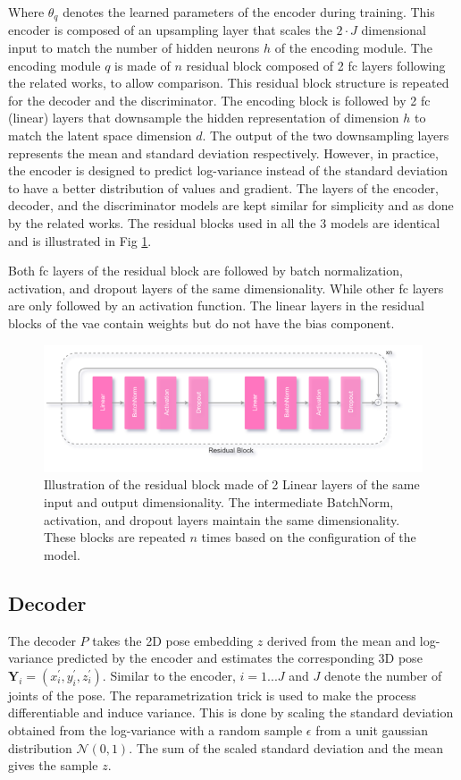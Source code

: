 Where $\theta_q$ denotes the learned parameters of the encoder during training. This encoder is composed of an upsampling layer that scales the $2\!\cdot\!J$ dimensional input to match the number of hidden neurons $h$ of the encoding module. The encoding module $q$ is made of $n$ residual block composed of 2 \ac{fc} layers following the related works, to allow comparison. This residual block structure is repeated for the decoder and the discriminator. The encoding block is followed by 2 \ac{fc} (linear) layers that downsample the hidden representation of dimension $h$ to match the latent space dimension $d$. The output of the two downsampling layers represents the mean and standard deviation respectively. However, in practice, the encoder is designed to predict log-variance instead of the standard deviation to have a better distribution of values and gradient. The layers of the encoder, decoder, and the discriminator models are kept similar for simplicity and as done by the related works. The residual blocks used in all the 3 models are identical and is illustrated in Fig \ref{fig:residual_block}.

Both \ac{fc} layers of the residual block are followed by batch normalization, activation, and dropout layers of the same dimensionality. While other \ac{fc} layers are only followed by an activation function. The linear layers in the residual blocks of the \ac{vae} contain weights but do not have the bias component.


\begin{figure}[h] 
    \centering
    \includegraphics[width=\textwidth]{figures/arch/res_block.png}
    \caption{Illustration of the residual block made of 2 Linear layers of the same input and output dimensionality. The intermediate BatchNorm, activation, and dropout layers maintain the same dimensionality. These blocks are repeated $n$ times based on the configuration of the model.
    }
    \label{fig:residual_block}
\end{figure}

\subsection{Decoder}
The decoder $P$ takes the 2D pose embedding $z$ derived from the mean and log-variance predicted by the encoder and estimates the corresponding 3D pose $\textbf{Y}_i = (x^\prime_i, y^\prime_i, z^\prime_i)$. Similar to the encoder, $i = 1 ... J$ and $J$ denote the number of joints of the pose. The reparametrization trick is used to make the process differentiable and induce variance. This is done by scaling the standard deviation obtained from the log-variance with a random sample $\epsilon$ from a unit gaussian distribution $\mathcal{N}(0,1)$. The sum of the scaled standard deviation and the mean gives the sample $z$.

